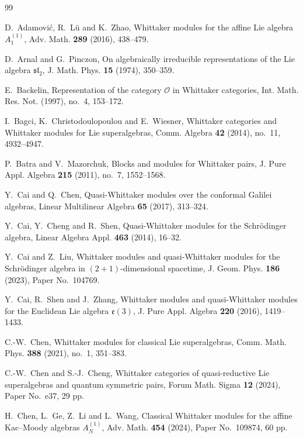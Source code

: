 \documentclass[12pt,reqno]{article}
\def\F{\mathfrak}
\def\C{\mathcal}
\begin{document}
	\begin{thebibliography}{99}

 D.~Adamovi\'c, R.~L\"u and K.~Zhao, Whittaker modules for the affine Lie algebra $A_1^{(1)}$, Adv. Math. {\bf 289} (2016), 438--479.

 D.~Arnal and G.~Pinczon, On algebraically irreducible representations of the Lie algebra $\F{sl}_2$, J. Math. Phys. {\bf 15} (1974), 350--359.

 E.~Backelin, Representation of the category $\C{O}$ in Whittaker categories, Int. Math. Res. Not. (1997), no.~4, 153--172.

I.~Bagci, K.~Christodoulopoulou and E.~Wiesner, Whittaker categories and Whittaker modules for Lie superalgebras, Comm. Algebra {\bf 42} (2014), no.~11, 4932--4947.

 P.~Batra and V.~Mazorchuk, Blocks and modules for Whittaker pairs, J. Pure Appl. Algebra {\bf 215} (2011), no.~7, 1552--1568.

 Y.~Cai and Q.~Chen, Quasi-Whittaker modules over the conformal Galilei algebras, Linear Multilinear Algebra {\bf 65} (2017), 313--324.

 Y.~Cai, Y.~Cheng and R.~Shen, Quasi-Whittaker modules for the Schr\"odinger algebra, Linear Algebra Appl. {\bf 463} (2014), 16--32.

 Y.~Cai and Z.~Liu, Whittaker modules and quasi-Whittaker modules for the Schr\"odinger algebra in $(2+1)$-dimensional spacetime, J. Geom. Phys. {\bf 186} (2023), Paper No.~104769.

 Y.~Cai, R.~Shen and J.~Zhang, Whittaker modules and quasi-Whittaker modules for the Euclidean Lie algebra $\F{e}(3)$, J. Pure Appl. Algebra {\bf 220} (2016), 1419--1433.

 C.-W.~Chen, Whittaker modules for classical Lie superalgebras, Comm. Math. Phys. {\bf 388} (2021), no.~1, 351--383.

 C.-W.~Chen and S.-J.~Cheng, Whittaker categories of quasi-reductive Lie superalgebras and quantum symmetric pairs, Forum Math. Sigma {\bf 12} (2024), Paper No.~e37, 29 pp.

 H.~Chen, L.~Ge, Z.~Li and L.~Wang, Classical Whittaker modules for the affine Kac--Moody algebras $A_N^{(1)}$, Adv. Math. {\bf 454} (2024), Paper No.~109874, 60 pp.




\end{thebibliography}
\end{document}
